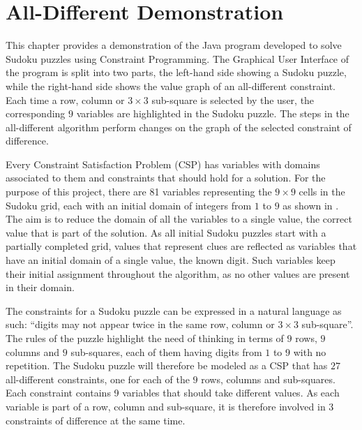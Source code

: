 \documentclass{l4proj}
\begin{document}
\chapter{All-Different Demonstration}
\label{chap5alldiffdemo}

\noindent This chapter provides a demonstration of the Java program developed to solve Sudoku puzzles using Constraint Programming. The Graphical User Interface of the program is split into two parts, the left-hand side showing a Sudoku puzzle, while the right-hand side shows the value graph of an all-different constraint. Each time a row, column or $3 \times 3$ sub-square is selected by the user, the corresponding $9$ variables are highlighted in the Sudoku puzzle. The steps in the all-different algorithm perform changes on the graph of the selected constraint of difference.

\noindent Every Constraint Satisfaction Problem (CSP) has variables with domains associated to them and constraints that should hold for a solution. For the purpose of this project, there are 81 variables representing the $9 \times 9$ cells in the Sudoku grid, each with an initial domain of integers from $1$ to $9$ as shown in . The aim is to reduce the domain of all the variables to a single value, the correct value that is part of the solution. As all initial Sudoku puzzles start with a partially completed grid, values that represent clues are reflected as variables that have an initial domain of a single value, the known digit. Such variables keep their initial assignment throughout the algorithm, as no other values are present in their domain.

\noindent The constraints for a Sudoku puzzle can be expressed in a natural language as such: ``digits may not appear twice in the same row, column or $3\times 3$ sub-square''. The rules of the puzzle highlight the need of thinking in terms of $9$ rows, $9$ columns and $9$ sub-squares, each of them having digits from $1$ to $9$ with no repetition. The Sudoku puzzle will therefore be modeled as a CSP \cite{simonis2005sudoku} that has $27$ all-different constraints, one for each of the $9$ rows, columns and sub-squares. Each constraint contains 9 variables that should take different values. As each variable is part of a row, column and sub-square, it is therefore involved in 3 constraints of difference at the same time.
\end{document}
